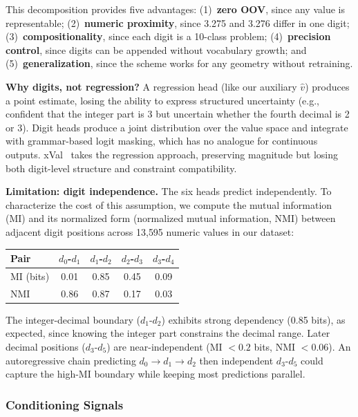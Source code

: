 \documentclass[sensors,article,submit,moreauthors,pdftex]{Definitions/mdpi}
\begin{document}
This decomposition provides five advantages: (1)~\textbf{zero OOV}, since any value is representable; (2)~\textbf{numeric proximity}, since 3.275 and 3.276 differ in one digit; (3)~\textbf{compositionality}, since each digit is a 10-class problem; (4)~\textbf{precision control}, since digits can be appended without vocabulary growth; and (5)~\textbf{generalization}, since the scheme works for any geometry without retraining.

\textbf{Why digits, not regression?} A regression head (like our auxiliary $\hat{v}$) produces a point estimate, losing the ability to express structured uncertainty (e.g., confident that the integer part is 3 but uncertain whether the fourth decimal is 2 or 3). Digit heads produce a joint distribution over the value space and integrate with grammar-based logit masking, which has no analogue for continuous outputs. xVal~\cite{xval} takes the regression approach, preserving magnitude but losing both digit-level structure and constraint compatibility.

\textbf{Limitation: digit independence.} The six heads predict independently. To characterize the cost of this assumption, we compute the mutual information (MI) and its normalized form (normalized mutual information, NMI) between adjacent digit positions across 13{,}595 numeric values in our dataset:

\begin{center}
\scriptsize
\begin{tabular}{@{}lcccc@{}}
\toprule
\textbf{Pair} & $d_0$-$d_1$ & $d_1$-$d_2$ & $d_2$-$d_3$ & $d_3$-$d_4$ \\
\midrule
MI (bits)  & 0.01 & 0.85 & 0.45 & 0.09 \\
NMI        & 0.86 & 0.87 & 0.17 & 0.03 \\
\bottomrule
\end{tabular}
\end{center}

\noindent The integer-decimal boundary ($d_1$-$d_2$) exhibits strong dependency (0.85 bits), as expected, since knowing the integer part constrains the decimal range. Later decimal positions ($d_3$-$d_5$) are near-independent (MI $< 0.2$ bits, NMI $< 0.06$). An autoregressive chain predicting $d_0 \to d_1 \to d_2$ then independent $d_3$-$d_5$ could capture the high-MI boundary while keeping most predictions parallel.

\subsubsection{Conditioning Signals}
\end{document}
